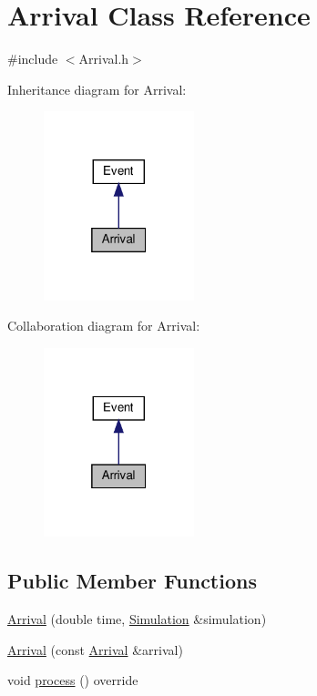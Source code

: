 \hypertarget{classArrival}{}\section{Arrival Class Reference}
\label{classArrival}


{\ttfamily \#include $<$Arrival.\+h$>$}



Inheritance diagram for Arrival\+:\nopagebreak
\begin{figure}[H]
\begin{center}
\leavevmode
\includegraphics[width=124pt]{classArrival__inherit__graph}
\end{center}
\end{figure}


Collaboration diagram for Arrival\+:\nopagebreak
\begin{figure}[H]
\begin{center}
\leavevmode
\includegraphics[width=124pt]{classArrival__coll__graph}
\end{center}
\end{figure}
\subsection*{Public Member Functions}
\begin{DoxyCompactItemize}
\item 
\hyperlink{classArrival_a996941f87624cdbe25ffdaf87672a34f}{Arrival} (double time, \hyperlink{classSimulation}{Simulation} \&simulation)
\item 
\hyperlink{classArrival_a4c92db3a71a26cd86c33323faee828f7}{Arrival} (const \hyperlink{classArrival}{Arrival} \&arrival)
\item 
void \hyperlink{classArrival_ad7da9fd4613164ece60d63be1bac6f1d}{process} () override
\end{DoxyCompactItemize}


